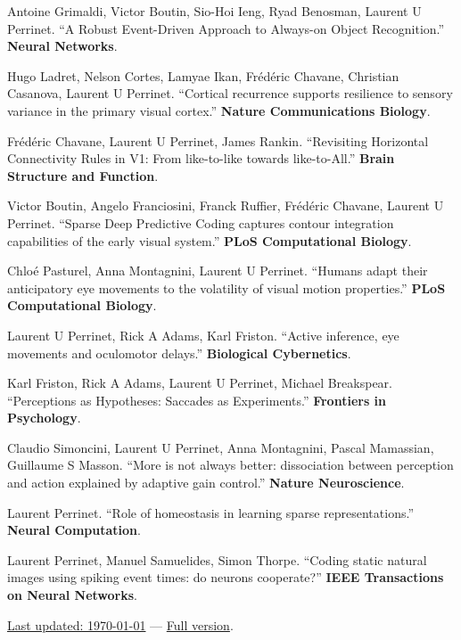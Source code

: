 \documentclass[11pt, a4paper]{article}
\newcommand{\years}[1]{\marginnote{\scriptsize #1}}
\begin{document}
\noindent\years{2024} Antoine Grimaldi, Victor Boutin, Sio-Hoi Ieng, Ryad Benosman, Laurent U Perrinet. ``A Robust Event-Driven Approach to Always-on Object Recognition.'' {\bf Neural Networks}.

\noindent\years{2023} Hugo Ladret, Nelson Cortes, Lamyae Ikan, Frédéric Chavane, Christian Casanova, Laurent U Perrinet. ``Cortical recurrence supports resilience to sensory variance in the primary visual cortex.'' {\bf Nature Communications Biology}.

\noindent\years{2022} Frédéric Chavane, Laurent U Perrinet, James Rankin. ``Revisiting Horizontal Connectivity Rules in V1: From like-to-like towards like-to-All.'' {\bf Brain Structure and Function}.

\noindent\years{2021} Victor Boutin, Angelo Franciosini, Franck Ruffier, Frédéric Chavane, Laurent U Perrinet. ``Sparse Deep Predictive Coding captures contour integration capabilities of the early visual system.'' {\bf PLoS Computational Biology}.

\noindent\years{2020} Chloé Pasturel, Anna Montagnini, Laurent U Perrinet. ``Humans adapt their anticipatory eye movements to the volatility of visual motion properties.'' {\bf PLoS Computational Biology}.

\noindent\years{2014} Laurent U Perrinet, Rick A Adams, Karl Friston. ``Active inference, eye movements and oculomotor delays.'' {\bf Biological Cybernetics}.

\noindent\years{2012} Karl Friston, Rick A Adams, Laurent U Perrinet, Michael Breakspear. ``Perceptions as Hypotheses: Saccades as Experiments.'' {\bf Frontiers in Psychology}.

\noindent\years{2012} Claudio Simoncini, Laurent U Perrinet, Anna Montagnini, Pascal Mamassian, Guillaume S Masson. ``More is not always better: dissociation between perception and action explained by adaptive gain control.'' {\bf Nature Neuroscience}.

\noindent\years{2010} Laurent Perrinet. ``Role of homeostasis in learning sparse representations.'' {\bf Neural Computation}.

\noindent\years{2004} Laurent Perrinet, Manuel Samuelides, Simon Thorpe. ``Coding static natural images using spiking event times: do neurons cooperate?'' {\bf IEEE Transactions on Neural Networks}.

\medskip
{}

{\footnotesize \href{https://github.com/laurentperrinet/perrinet_curriculum-vitae.tex}{Last updated: \today} --- \href{https://github.com/laurentperrinet/perrinet_curriculum-vitae.tex/blob/master/perrinet_curriculum-vitae-full.pdf}{Full version}.}
\end{document}
